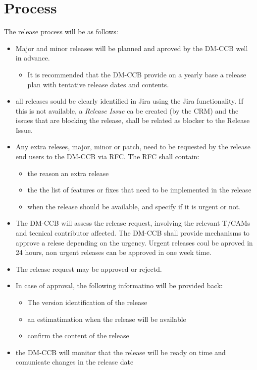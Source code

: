 \section{Process} \label{sec:process}

The release process will be as follows:

\begin{itemize}
\item Major and minor releases will be planned and aproved by the DM-CCB well in advance. 
\begin{itemize}
  \item It is recommended that the DM-CCB provide on a yearly base a release plan with tentative release dates and contents.
\end{itemize}
\item all releases sould be clearly identified in Jira using the Jira functionality. If this is not available, a {\it Release Issue} ca be created (by the CRM) and the issues that are blocking the release, shall be related as blocker to the Release Issue. 
\item Any extra releses, major, minor or patch, need to be requested by the release end users to the DM-CCB via RFC. The RFC shall contain:
\begin{itemize}
  \item the reason an extra release
  \item the the list of features or fixes that need to be implemented in the release
  \item when the release should be available, and specify if it is urgent or not.
\end{itemize}
\item The DM-CCB will assess the release request, involving the relevant T/CAMs and tecnical contributor affected. 
The DM-CCB shall provide mechanisms to approve a relese depending on the urgency. 
Urgent releases coul be aproved in 24 hours, non urgent releases can be approved in one week time.
\item The release request may be approved or rejectd.
\item In case of approval, the following informatino will be provided back:
\begin{itemize}
  \item The version identification of the release
  \item an estimatimation when the release will be available
  \item confirm the content of the release
\end{itemize}
\item the DM-CCB will monitor that the release will be ready on time and comunicate changes in the release date
\end{itemize}


